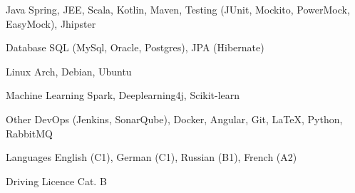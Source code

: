 
\begin{cvskills}

  \cvskill
    {Java}
    {Spring, JEE, Scala, Kotlin, Maven, Testing (JUnit, Mockito, PowerMock, EasyMock), Jhipster} %

  \cvskill
    {Database}
    {SQL (MySql, Oracle, Postgres), JPA (Hibernate)}

  \cvskill
    {Linux}
    {Arch, Debian, Ubuntu}

  \cvskill
    {Machine Learning}
    {Spark, Deeplearning4j, Scikit-learn}

  \cvskill
    {Other}
    {DevOps (Jenkins, SonarQube), Docker, Angular, Git, LaTeX, Python, RabbitMQ}

  \cvskill
    {Languages}
    {English (C1), German (C1), Russian (B1), French (A2)}

  \cvskill
    {Driving Licence}
    {Cat. B}

\end{cvskills}
